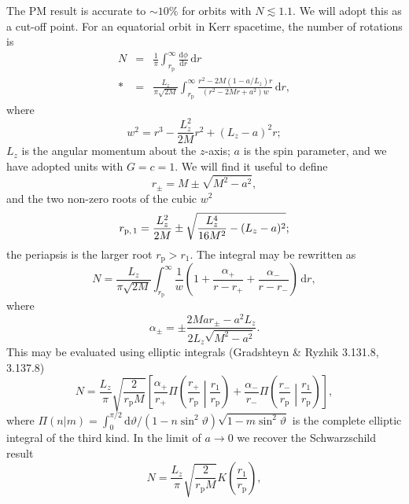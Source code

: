 \documentclass[aps,prd,amsfonts,amssymb,amsmath,reprint,showpacs,groupedaddress]{revtex4-1}
\newcommand{\sub}[1]{\ensuremath{_\text{#1}}}
\newcommand{\dd}{\ensuremath{\mathrm{d}}}
\newcommand{\diff}[2]{\ensuremath{\frac{\dd {#1}}{\dd {#2}}}}
\newcommand{\intd}[4]{\ensuremath{\int_{#1}^{#2}{#3}\,\dd{#4}}}
\newcommand{\recip}[1]{\ensuremath{\frac{1}{#1}}}
\begin{document}
The PM result is accurate to $\sim 10\%$ for orbits with $N \lesssim 1.1$. We will adopt this as a cut-off point. For an equatorial orbit in Kerr spacetime, the number of rotations is
\begin{eqnarray}
N & = & \recip{\pi}\intd{r\sub{p}}{\infty}{\diff{\phi}{r}}{r} \nonumber \\*
 & = & \frac{L_z}{\pi\sqrt{2M}}\intd{r\sub{p}}{\infty}{\frac{r^2 - 2M(1 - a/L_z)r}{(r^2 - 2Mr + a^2)w}}{r},
\end{eqnarray}
where
\begin{equation}
w^2 = r^3 - \frac{L_z^2}{2M}r^2 + (L_z - a)^2r;
\end{equation}
$L_z$ is the angular momentum about the $z$-axis; $a$ is the spin parameter, and we have adopted units with $G = c = 1$. We will find it useful to define
\begin{equation}
r_\pm = M \pm \sqrt{M^2 - a^2},
\end{equation}
and the two non-zero roots of the cubic $w^2$
\begin{equation}
r\sub{p,\,1} = \frac{L_z^2}{2M} \pm \sqrt{\frac{L_z^4}{16M^2} - (L_z -a)^2};
\end{equation}
the periapsis is the larger root $r\sub{p} > r_1$. The integral may be rewritten as
\begin{equation}
N = \frac{L_z}{\pi\sqrt{2M}}\intd{r\sub{p}}{\infty}{\recip{w}\left(1 + \frac{\alpha_+}{r-r_+} + \frac{\alpha_-}{r-r_-}\right)}{r},
\end{equation}
where
\begin{equation}
\alpha_\pm = \pm\frac{2Mar_\pm - a^2L_z}{2L_z\sqrt{M^2-a^2}}.
\end{equation}
This may be evaluated using elliptic integrals (Gradshteyn \& Ryzhik\cite{Gradshteyn2000} 3.131.8, 3.137.8)
\begin{equation}
N = \frac{L_z}{\pi}\sqrt{\frac{2}{r\sub{p}M}}\left[\frac{\alpha_+}{r_+}\Pi\left(\frac{r_+}{r\sub{p}}\middle|\frac{r_1}{r\sub{p}}\right) + \frac{\alpha_-}{r_-}\Pi\left(\frac{r_-}{r\sub{p}}\middle|\frac{r_1}{r\sub{p}}\right)\right],
\end{equation}
where $\Pi(n|m) = \int_{0}^{\pi/2}{\dd\vartheta/(1-n\sin^2\vartheta)\sqrt{1-m\sin^2\vartheta}}$ is the complete elliptic integral of the third kind. In the limit of $a \rightarrow 0$ we recover the Schwarzschild result\cite{Cutler1994}
\begin{equation}
N = \frac{L_z}{\pi}\sqrt{\frac{2}{r\sub{p}M}}K\left(\frac{r_1}{r\sub{p}}\right),
\end{equation}
\end{document}
